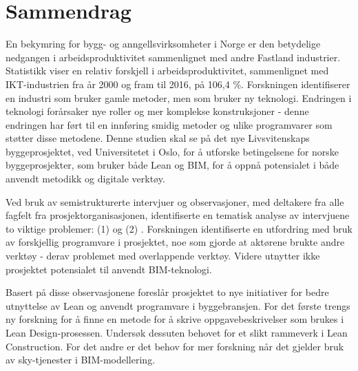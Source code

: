 \clearpage
{} 				
\setcounter{page}{1}

\pagestyle{fancy}
\fancyhf{}
\renewcommand{\chaptermark}[1]{\markboth{\chaptername\ \thechapter.\ #1}{}}
\renewcommand{\sectionmark}[1]{\markright{\thesection\ #1}}
\renewcommand{\headrulewidth}{0.1ex}
\renewcommand{\footrulewidth}{0.1ex}
\fancyfoot[LE,RO]{\thepage}
\fancypagestyle{plain}{\fancyhf{}\fancyfoot[LE,RO]{\thepage}\renewcommand{\headrulewidth}{0ex}}

\section*{\Large Sammendrag}

\noindent En bekymring for bygg- og anngellsvirksomheter i Norge er den betydelige nedgangen i arbeidsproduktivitet sammenlignet med andre Fastland industrier. Statistikk viser en relativ forskjell i arbeidsproduktivitet, sammenlignet med IKT-industrien fra år 2000 og fram til 2016, på 106,4 \%. Forskningen identifiserer en industri som bruker gamle metoder, men som bruker ny teknologi. Endringen i teknologi forårsaker nye roller og mer komplekse konstruksjoner - denne endringen har ført til en innføring smidig metoder og ulike programvarer som støtter disse metodene. Denne studien skal se på det nye Livsvitenskaps byggeprosjektet, ved Universitetet i Oslo, for å utforske betingelsene for norske byggeprosjekter, som bruker både Lean og BIM, for å oppnå potensialet i både anvendt metodikk og digitale verktøy.

Ved bruk av semistrukturerte intervjuer og observasjoner, med deltakere fra alle fagfelt fra prosjektorganisasjonen, identifiserte en tematisk analyse av intervjuene to viktige problemer: (1)  og (2) . Forskningen identifiserte en utfordring med bruk av forskjellig programvare i prosjektet, noe som gjorde at aktørene brukte andre verktøy - derav problemet med overlappende verktøy. Videre utnytter ikke prosjektet potensialet til anvendt BIM-teknologi.

Basert på disse observasjonene foreslår prosjektet to nye initiativer for bedre utnyttelse av Lean og anvendt programvare i byggebransjen. For det første trengs ny forskning for å finne en metode for å skrive oppgavebeskrivelser som brukes i Lean Design-prosessen. Undersøk dessuten behovet for et slikt rammeverk i Lean Construction. For det andre er det behov for mer forskning når det gjelder bruk av sky-tjenester i BIM-modellering.
\clearpage